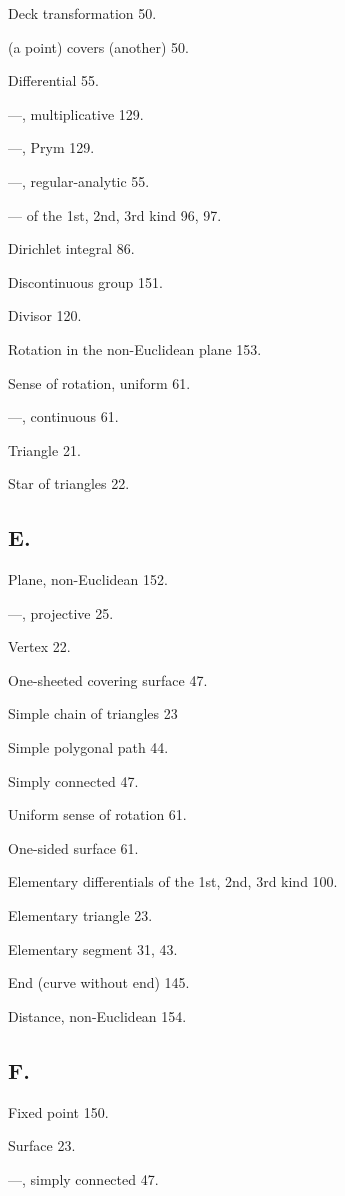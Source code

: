 \documentclass{article}
\begin{document}
Deck transformation 50.

(a point) covers (another) 50.

Differential 55.

---, multiplicative 129.

---, Prym 129.

---, regular-analytic 55.

--- of the 1st, 2nd, 3rd kind 96, 97.

Dirichlet integral 86.

Discontinuous group 151.

Divisor 120.

Rotation in the non-Euclidean plane 153.

Sense of rotation, uniform 61.

---, continuous 61.

Triangle 21.

Star of triangles 22.

\subsection*{E.}

Plane, non-Euclidean 152.

---, projective 25.

Vertex 22.

One-sheeted covering surface 47.

Simple chain of triangles 23

Simple polygonal path 44.

Simply connected 47.

Uniform sense of rotation 61.

One-sided surface 61.

Elementary differentials of the 1st, 2nd, 3rd kind 100.

Elementary triangle 23.

Elementary segment 31, 43.

End (curve without end) 145.

Distance, non-Euclidean 154.

\subsection*{F.}

Fixed point 150.

Surface 23.

---, simply connected 47.
\end{document}
